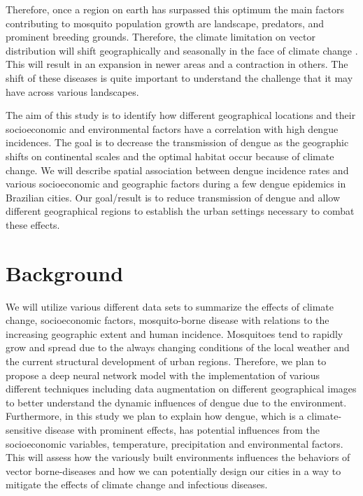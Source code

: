 \documentclass[11pt]{article}
\begin{document}
Therefore, once a region on earth has surpassed this optimum the main factors contributing to mosquito population growth are landscape, predators, and prominent breeding grounds. Therefore, the climate limitation on vector distribution will shift geographically and seasonally in the face of climate change \cite{zellweger2017socioeconomic}\cite{caminade2019impact}. This will result in an expansion in newer areas and a contraction in others. The shift of these diseases is quite important to understand the challenge that it may have across various landscapes.



The aim of this study is to identify how different geographical locations and their socioeconomic and environmental factors have a correlation with high dengue incidences. The goal is to decrease the transmission of dengue as the geographic shifts on continental scales and the optimal habitat occur because of climate change. We will describe spatial association between dengue incidence rates and various socioeconomic and geographic factors during a few dengue epidemics in Brazilian cities. Our goal/result is to reduce transmission of dengue and allow different geographical regions to establish the urban settings necessary to combat these effects.

\section{Background}
We will utilize various different data sets to summarize the effects of climate change, socioeconomic factors, mosquito-borne disease with relations to the increasing geographic extent and human incidence. Mosquitoes tend to rapidly grow and spread due to the always changing conditions of the local weather and the current structural development of urban regions. Therefore, we plan to propose a deep neural network model with the implementation of various different techniques including data augmentation on different geographical images to better understand the dynamic influences of dengue due to the environment. Furthermore, in this study we plan to explain how dengue, which is a climate-sensitive disease with prominent effects, has potential influences from the socioeconomic variables, temperature, precipitation and environmental factors. This will assess how the variously built environments influences the behaviors of vector borne-diseases and how we can potentially design our cities in a way to mitigate the effects of climate change and infectious diseases.
\end{document}
